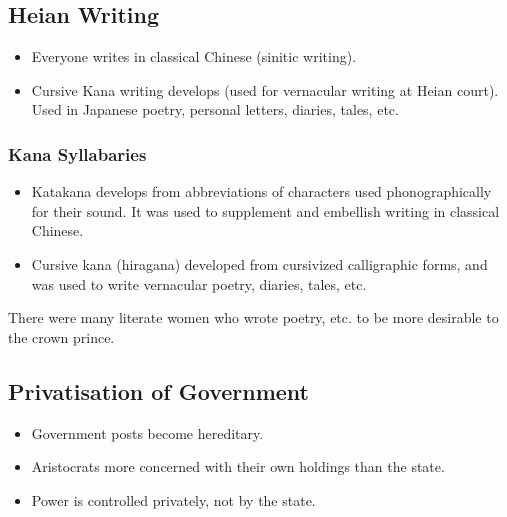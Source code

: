 \documentclass[class=article, crop=false]{standalone}
\begin{document}
  \subsection{Heian Writing}
  \begin{itemize}
    \item Everyone writes in classical Chinese (sinitic writing).
    \item Cursive Kana writing develops (used for vernacular writing at Heian court). Used in Japanese poetry, personal letters, diaries, tales, etc.
  \end{itemize}
  \subsubsection{Kana Syllabaries}
  \begin{itemize}
    \item Katakana develops from abbreviations of characters used phonographically for their sound. It was used to supplement and embellish writing in classical Chinese.
    \item Cursive kana (hiragana) developed from cursivized calligraphic forms, and was used to write vernacular poetry, diaries, tales, etc.
  \end{itemize}
  \begin{note}{}
    There were many literate women who wrote poetry, etc. to be more desirable to the crown prince.
  \end{note}
  \subsection{Privatisation of Government}
  \begin{itemize}
    \item Government posts become hereditary.
    \item Aristocrats more concerned with their own holdings than the state.
    \item Power is controlled privately, not by the state.
  \end{itemize}
\end{document}
